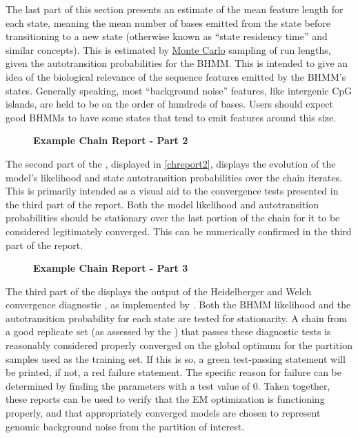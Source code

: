 The last part of this section presents an estimate of the mean feature length for each state, meaning the mean number of bases emitted from the state before transitioning to a new state (otherwise known as ``state residency time'' and similar concepts). This is estimated by \hyperref[ssec:MonteCarlo]{Monte Carlo} sampling of run lengths, given the autotransition probabilities for the BHMM. This is intended to give an idea of the biological relevance of the sequence features emitted by the BHMM's states. Generally speaking, most ``background noise'' features, like intergenic CpG islands, are held to be on the order of hundreds of bases. Users should expect good BHMMs to have some states that tend to emit features around this size.

\begin{figure}[!h]
    \caption{{\bf Example \protect{} Chain Report - Part 2}}
    \label{chreport2}
\end{figure}

The second part of the , displayed in \autoref{chreport2}, displays the evolution of the model's likelihood and state autotransition probabilities over the chain iterates. This is primarily intended as a visual aid to the convergence tests presented in the third part of the report. Both the model likelihood and autotransition probabilities should be stationary over the last portion of the chain for it to be considered legitimately converged. This can be numerically confirmed in the third part of the report.

\begin{figure}[!h]
    \caption{{\bf Example \protect{} Chain Report - Part 3}}
    \label{chreport3}
\end{figure}

The third part of the  displays the output of the Heidelberger and Welch convergence diagnostic \cite{Heidelberger1981}, as implemented by  \cite{Pfiffer2020}. Both the BHMM likelihood and the autotransition probability for each state are tested for stationarity. A chain from a good replicate set (as assessed by the ) that passes these diagnostic tests is reasonably considered properly converged on the global optimum for the partition samples used as the training set. If this is so, a green test-passing statement will be printed, if not, a red failure statement. The specific reason for failure can be determined by finding the parameters with a test value of 0. Taken together, these reports can be used to verify that the EM optimization is functioning properly, and that appropriately converged models are chosen to represent genomic background noise from the partition of interest.

